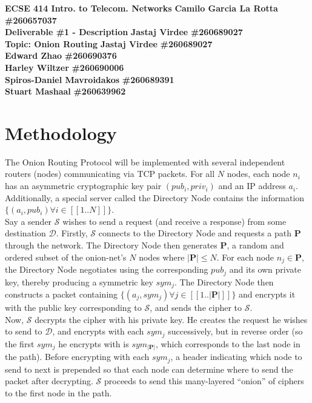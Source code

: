 \documentclass[10pt]{article}
\begin{document}
\noindent
\large \textbf{ECSE 414 Intro. to Telecom. Networks} \hfill \textbf{Camilo Garcia La Rotta} \textbf{\#260657037} \\
\large \textbf{Deliverable \#1 - Description} \hfill \textbf{Jastaj Virdee} \textbf{\#260689027} \\
\large \textbf{Topic: Onion Routing} \hfill \textbf{Jastaj Virdee} \textbf{\#260689027} \\
\text{} \hfill \textbf{Edward Zhao} \textbf{\#260690376}\\
\text{} \hfill \textbf{Harley Wiltzer} \textbf{\#260690006}\\
\text{} \hfill \textbf{Spiros-Daniel Mavroidakos} \textbf{\#260689391}\\
\text{} \hfill \textbf{Stuart Mashaal} \textbf{\#260639962}\\

\section*{Methodology}

The Onion Routing Protocol will be implemented with several independent routers (nodes)
communicating via TCP packets.  For all $N$ nodes, each node $n_i$ has
an asymmetric cryptographic key pair $(pub_{i},priv_{i})$ and an IP address $a_i$.  Additionally, a special
server called the Directory Node contains the information $\{(a_i, pub_i) \forall i \in [\![1..N]\!]\}$.\\

\noindent Say a sender $\mathcal{S}$ wishes to send a request (and receive a response)
from some destination $\mathcal{D}$.  Firstly, $\mathcal{S}$ connects to the Directory Node
and requests a path $\mathbf{P}$ through the network. The Directory Node then generates
$\mathbf{P}$, a random and ordered subset of the onion-net's $N$ nodes where $|\mathbf{P}| \leq N$.  For each node
$n_j \in \mathbf{P}$, the Directory Node negotiates using the corresponding
$pub_j$ and its own private key, thereby producing a symmetric key $sym_j$.  The Directory
Node then constructs a packet containing $\{(a_j, sym_j) \forall j \in [\![1..|\mathbf{P}|]\!]\}$ and
encrypts it with the public key corresponding to $\mathcal{S}$, and sends the cipher to $\mathcal{S}$.\\

\noindent Now, $\mathcal{S}$ decrypts the cipher with his private key. He creates the
request he wishes to send to $\mathcal{D}$, and encrypts with each $sym_j$
successively, but in reverse order (so the first $sym_j$ he encrypts with is $sym_{|\mathbf{P}|}$, which corresponds
to the last node in the path). Before encrypting with each $sym_j$, a header
indicating which node to send to next is prepended so that each node can
determine where to send the packet after decrypting. $\mathcal{S}$ proceeds to
send this many-layered ``onion'' of ciphers to the first node in the path.\\
\end{document}
